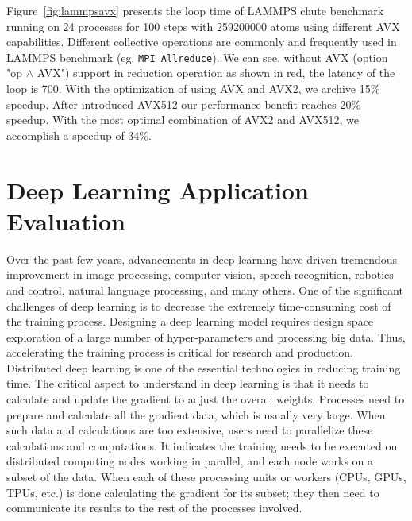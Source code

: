 \documentclass[5p,times,twocolumn]{elsarticle}
\newcommand{\mpifunc}[1]{\lstinline"MPI_#1"\xspace}
\begin{document}
Figure~\ref{fig:lammpsavx} presents the loop time of LAMMPS chute benchmark running
on 24 processes for 100 steps with 259200000 atoms using different AVX capabilities.
Different collective operations are commonly and frequently used in LAMMPS benchmark (eg. \mpifunc{Allreduce}).
We can see, without AVX (option "op $\wedge$ AVX") support in reduction operation as shown in red, the latency of the loop is 700.
With the optimization of using AVX and AVX2, we archive 15\% speedup. After introduced AVX512 our performance
benefit reaches 20\% speedup. With the most optimal combination of AVX2 and AVX512,
we accomplish a speedup of 34\%.

\section{Deep Learning Application Evaluation}\label{sec:application}
Over the past few years, advancements in deep learning have driven
tremendous improvement in image processing, computer vision, speech
recognition, robotics and control, natural language processing, and
many others. One of the significant challenges of deep learning is to
decrease the extremely time-consuming cost of the training process.
%
Designing a deep learning model
requires design space exploration of a large number of hyper-parameters and processing big data.
Thus, accelerating the training process is critical for research and production. Distributed deep learning is one of the essential technologies in reducing training time.
%
The critical aspect to understand in deep learning is that it needs to calculate and update
the gradient to adjust the overall weights.
%
Processes need to prepare and calculate all the gradient data, which is usually very large.
When such data and calculations are too extensive, users need to parallelize these calculations and computations.
%
It indicates the training needs to be executed on distributed computing nodes working
in parallel, and each node works on a subset of the data.
%
When each of these processing units or workers (CPUs, GPUs, TPUs, etc.) is done
calculating the gradient for its subset; they then need to communicate its results
to the rest of the processes involved.
\end{document}
